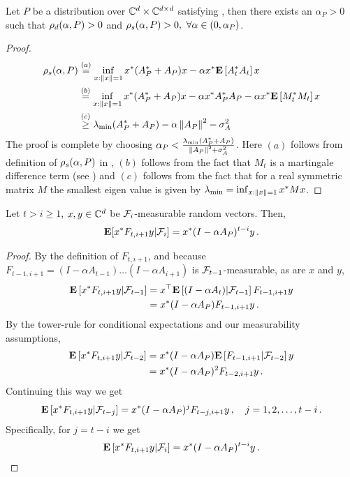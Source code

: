 \begin{lemma}\label{lm:pd}
Let $P$ be a distribution over $\mathbb{C}^d\times \mathbb{C}^{d \times d}$ satisfying , then there exists an $\alpha_P>0$ such that $\rho_d(\alpha,P)>0$ and $\rho_s(\alpha,P)>0,~\forall \alpha \in (0,\alpha_P)$.
\end{lemma}
\begin{proof}
\begin{align*}
\rho_s(\alpha,P)&\stackrel{(a)}{=}\inf_{x:\left\| x\right\|=1}x^* (A_P^*+A_P)x -\alpha x^*\mathbf{E}\left[A_t^* A_t\right] x\\
&\stackrel{(b)}{=}\inf_{x:\left\| x\right\|=1}x^* (A_P^*+A_P)x -\alpha x^* A^*_P A_P -\alpha x^* \mathbf{E}\left[M_t^* M_t\right] x\\
&\stackrel{(c)}{\geq} \lambda_{\min}(A^*_P+A_P)-\alpha \left\| A_P\right\|^2-\sigma^2_A
\end{align*}
The proof is complete by choosing $\alpha_P<\frac{\lambda_{\min}(A^*_P+A_P)}{\left\| A_P\right\|^2+\sigma^2_A}$. Here $(a)$ follows from definition of $\rho_s(\alpha,P)$ in , $(b)$ follows from the fact that $M_t$ is a martingale difference term (see ) and $(c)$ follows from the fact that for a real symmetric matrix $M$ the smallest eigen value is given by $\lambda_{\min}=\inf_{x:\left\| x\right\|=1} x^* M x $.
\end{proof}





\begin{lemma}\label{lem:genunroll}
Let $t>i\ge 1$, $x,y\in \mathbb{C}^d$ be $\mathcal{F}_{i}$-measurable random vectors. Then,
\begin{align*}
\mathbf{E}[x^* F_{t,i+1}y|\mathcal{F}_i]=x^* (I-\alpha A_P)^{t-i} y\,.
\end{align*}
\end{lemma}
\begin{proof}
By the definition of $F_{t,i+1}$,
and because $F_{t-1,i+1} = (I-\alpha A_{t-1}) \dots (I-\alpha A_{i+1})$ is $\mathcal{F}_{t-1}$-measurable,
as are $x$ and $y$,
\begin{align*}
\mathbf{E}\left[x^* F_{t,i+1} y | \mathcal{F}_{t-1} \right] &= x^\top \mathbf{E}\left[ (I-\alpha A_t) | \mathcal{F}_{t-1} \right] F_{t-1,i+1} y\\
&=x^*  (I-\alpha A_P)  F_{t-1,i+1} y\,.
\end{align*}
By the tower-rule for conditional expectations and our measurability assumptions,
\begin{align*}
\mathbf{E}\left[x^* F_{t,i+1} y | \mathcal{F}_{t-2} \right]
&=x^*  (I-\alpha A_P)  \mathbf{E}\left[F_{t-1,i+1} |\mathcal{F}_{t-2}\right] y\\
&= x^* (I-\alpha A_P)^2 F_{t-2,i+1} y\,.
\end{align*}
Continuing this way we get
\begin{align*}
\mathbf{E}\left[x^* F_{t,i+1} y | \mathcal{F}_{t-j} \right]
= x^* (I-\alpha A_P)^j F_{t-j,i+1} y\,, \quad j=1,2,\dots,t-i\,.
\end{align*}
Specifically, for $j=t-i$ we get
\begin{align*}
\mathbf{E}\left[x^* F_{t,i+1} y | \mathcal{F}_{i} \right]  = x^* (I-\alpha A_P)^{t-i} y\,.
\end{align*}
\end{proof}

